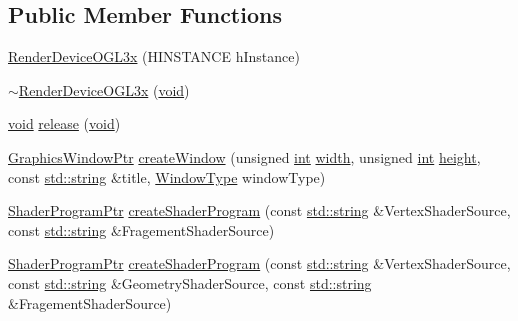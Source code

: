 \subsection*{Public Member Functions}
\begin{DoxyCompactItemize}
\item 
\hyperlink{class_a_c_t_k_1_1_render_device_o_g_l3x_a775994c43debce02554d831f989bdd90}{Render\-Device\-O\-G\-L3x} (H\-I\-N\-S\-T\-A\-N\-C\-E h\-Instance)
\item 
\hyperlink{class_a_c_t_k_1_1_render_device_o_g_l3x_aec483eb95ad591a96b681fc303e8c9eb}{$\sim$\-Render\-Device\-O\-G\-L3x} (\hyperlink{wglew_8h_aeea6e3dfae3acf232096f57d2d57f084}{void})
\item 
\hyperlink{wglew_8h_aeea6e3dfae3acf232096f57d2d57f084}{void} \hyperlink{class_a_c_t_k_1_1_render_device_o_g_l3x_a759e7bb4f62d860409ca272c2700dbdb}{release} (\hyperlink{wglew_8h_aeea6e3dfae3acf232096f57d2d57f084}{void})
\item 
\hyperlink{namespace_a_c_t_k_a73ab07fc6a568d003d19f3ed14ea7143}{Graphics\-Window\-Ptr} \hyperlink{class_a_c_t_k_1_1_render_device_o_g_l3x_a4a046f75d7f7a9cf37c22189882b92bf}{create\-Window} (unsigned \hyperlink{wglew_8h_a500a82aecba06f4550f6849b8099ca21}{int} \hyperlink{glew_8h_aa105b18f96e6bc2485cb7f576a7fb9ba}{width}, unsigned \hyperlink{wglew_8h_a500a82aecba06f4550f6849b8099ca21}{int} \hyperlink{glew_8h_aa214bd63e12f7ddf524c83894fcc69a7}{height}, const \hyperlink{glew_8h_ae9ea2d206f76ea82db7a2ea002fdef2f}{std\-::string} \&title, \hyperlink{namespace_a_c_t_k_a5cb71db6f350f73a1acaf41781bffb5b}{Window\-Type} window\-Type)
\item 
\hyperlink{namespace_a_c_t_k_a34512c71be222dc06a2906d6c00d2c4f}{Shader\-Program\-Ptr} \hyperlink{class_a_c_t_k_1_1_render_device_o_g_l3x_a59c78435be0ffd5bf93a8971720fdb02}{create\-Shader\-Program} (const \hyperlink{glew_8h_ae9ea2d206f76ea82db7a2ea002fdef2f}{std\-::string} \&Vertex\-Shader\-Source, const \hyperlink{glew_8h_ae9ea2d206f76ea82db7a2ea002fdef2f}{std\-::string} \&Fragement\-Shader\-Source)
\item 
\hyperlink{namespace_a_c_t_k_a34512c71be222dc06a2906d6c00d2c4f}{Shader\-Program\-Ptr} \hyperlink{class_a_c_t_k_1_1_render_device_o_g_l3x_a5a67b0547744f9ea47599720174661c5}{create\-Shader\-Program} (const \hyperlink{glew_8h_ae9ea2d206f76ea82db7a2ea002fdef2f}{std\-::string} \&Vertex\-Shader\-Source, const \hyperlink{glew_8h_ae9ea2d206f76ea82db7a2ea002fdef2f}{std\-::string} \&Geometry\-Shader\-Source, const \hyperlink{glew_8h_ae9ea2d206f76ea82db7a2ea002fdef2f}{std\-::string} \&Fragement\-Shader\-Source)
\end{DoxyCompactItemize}


